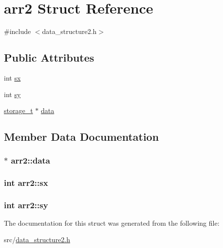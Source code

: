 \hypertarget{structarr2}{}\section{arr2 Struct Reference}
\label{structarr2}


{\ttfamily \#include $<$data\+\_\+structure2.\+h$>$}

\subsection*{Public Attributes}
\begin{DoxyCompactItemize}
\item 
int \hyperlink{structarr2_a279dbaf4ea8d31e574dbf72bc3483d6a}{sx}
\item 
int \hyperlink{structarr2_ac8d78c9cb4a77c44ef24b738814010c6}{sy}
\item 
\hyperlink{setting_8h_a3529be440b2ef96493a3e8c22fcfcecc}{storage\+\_\+t} $\ast$ \hyperlink{structarr2_ae23726180dfc451cc9b35177f9fbc990}{data}
\end{DoxyCompactItemize}


\subsection{Member Data Documentation}
\subsubsection[{data}]{$\ast$ arr2\+::data}\hypertarget{structarr2_ae23726180dfc451cc9b35177f9fbc990}{}\label{structarr2_ae23726180dfc451cc9b35177f9fbc990}
\subsubsection[{sx}]{\setlength{\rightskip}{0pt plus 5cm}int arr2\+::sx}\hypertarget{structarr2_a279dbaf4ea8d31e574dbf72bc3483d6a}{}\label{structarr2_a279dbaf4ea8d31e574dbf72bc3483d6a}
\subsubsection[{sy}]{\setlength{\rightskip}{0pt plus 5cm}int arr2\+::sy}\hypertarget{structarr2_ac8d78c9cb4a77c44ef24b738814010c6}{}\label{structarr2_ac8d78c9cb4a77c44ef24b738814010c6}


The documentation for this struct was generated from the following file\+:\begin{DoxyCompactItemize}
\item 
src/\hyperlink{data__structure2_8h}{data\+\_\+structure2.\+h}\end{DoxyCompactItemize}
